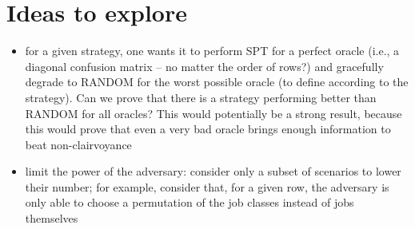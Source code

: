 \documentclass{article}
\begin{document}
\section{Ideas to explore}

\begin{itemize}
    \item for a given strategy, one wants it to perform SPT for a perfect oracle (i.e., a diagonal confusion matrix -- no matter the order of rows?) and gracefully degrade to RANDOM for the worst possible oracle (to define according to the strategy). Can we prove that there is a strategy performing better than RANDOM for all oracles? This would potentially be a strong result, because this would prove that even a very bad oracle brings enough information to beat non-clairvoyance
    \item limit the power of the adversary: consider only a subset of scenarios to lower their number; for example, consider that, for a given row, the adversary is only able to choose a permutation of the job classes instead of jobs themselves
\end{itemize}



\end{document}

